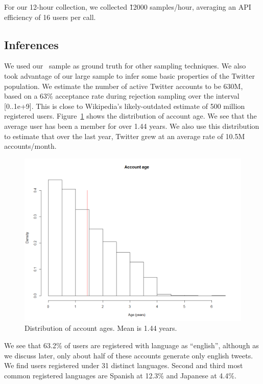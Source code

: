  For our 12-hour collection, we collected \~12000 samples/hour,
 averaging an API efficiency of 16 users per call.

 \subsection{Inferences}

 We used our \id~sample as ground truth for other sampling techniques.
 We also took advantage of our large sample to infer some basic
 properties of the Twitter population. We estimate the number of
 active Twitter accounts to be 630M, based on a 63\% acceptance rate
 during rejection sampling over the interval [0..1e+9]. This is close
 to Wikipedia's likely-outdated estimate of 500 million registered
 users. Figure~\ref{fig:age} shows the distribution of account age.
 We see that the average user has been a member for over 1.44 years.
 We also use this distribution to estimate that over the last year,
 Twitter grew at an average rate of 10.5M accounts/month. 

 \begin{figure}[htb]
\begin{center}
  \includegraphics[width=0.8\columnwidth]{figs/account_age_sample5000.png}
\end{center}
\caption{Distribution of account ages. Mean is 1.44 years.}
\label{fig:age}
\end{figure}
 
 We see that 63.2\% of users are registered with language as
 “english”, although as we discuss later, only about half of these
 accounts generate only english tweets. We find users registered under
 31 distinct languages. Second and third most common registered
 languages are Spanish at 12.3\% and Japanese at 4.4\%.

